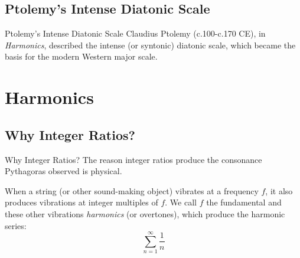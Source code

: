 \documentclass{beamer}
\begin{document}
\subsection{Ptolemy's Intense Diatonic Scale}
\begin{frame}{Ptolemy's Intense Diatonic Scale}
    \pause Claudius Ptolemy (c.100-c.170 CE), in \textit{Harmonics}, described the intense (or syntonic) diatonic scale, which became the basis for the modern Western major scale.
\end{frame}

\section{Harmonics}
\subsection{Why Integer Ratios?}
\begin{frame}{Why Integer Ratios?}
    \pause The reason integer ratios produce the consonance Pythagoras observed is physical.
    
    \pause When a string (or other sound-making object) vibrates at a frequency $f$, it also produces vibrations at integer multiples of $f$.
    \pause We call $f$ the fundamental and these other vibrations \textit{harmonics} (or overtones), which produce the harmonic series:
    \pause $$ \sum_{n=1}^\infty \frac{1}{n} $$
\end{frame}
\end{document}
